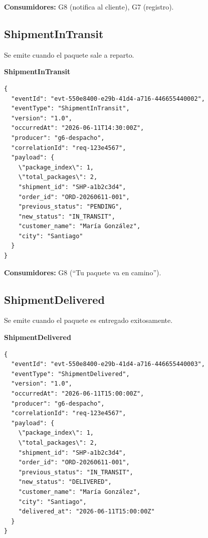\documentclass[11pt, a4paper]{article}
\newcommand{\contractheader}[1]{%
  \noindent\colorbox{primary!10}{%
    \parbox{\dimexpr\textwidth-2\fboxsep}{%
      \textbf{\faFileCode\quad #1}%
    }%
  }
  \vspace{0.3cm}
}
\begin{document}
\textbf{Consumidores:} G8 (notifica al cliente), G7 (registro).

\vspace{0.4cm}

\subsection{ShipmentInTransit}

Se emite cuando el paquete sale a reparto.

\contractheader{ShipmentInTransit}

\begin{lstlisting}
{
  "eventId": "evt-550e8400-e29b-41d4-a716-446655440002",
  "eventType": "ShipmentInTransit",
  "version": "1.0",
  "occurredAt": "2026-06-11T14:30:00Z",
  "producer": "g6-despacho",
  "correlationId": "req-123e4567",
  "payload": {
    \"package_index\": 1,
    \"total_packages\": 2,
    "shipment_id": "SHP-a1b2c3d4",
    "order_id": "ORD-20260611-001",
    "previous_status": "PENDING",
    "new_status": "IN_TRANSIT",
    "customer_name": "María González",
    "city": "Santiago"
  }
}
\end{lstlisting}

\textbf{Consumidores:} G8 (``Tu paquete va en camino'').

\vspace{0.4cm}

\subsection{ShipmentDelivered}

Se emite cuando el paquete es entregado exitosamente.

\contractheader{ShipmentDelivered}

\begin{lstlisting}
{
  "eventId": "evt-550e8400-e29b-41d4-a716-446655440003",
  "eventType": "ShipmentDelivered",
  "version": "1.0",
  "occurredAt": "2026-06-11T15:00:00Z",
  "producer": "g6-despacho",
  "correlationId": "req-123e4567",
  "payload": {
    \"package_index\": 1,
    \"total_packages\": 2,
    "shipment_id": "SHP-a1b2c3d4",
    "order_id": "ORD-20260611-001",
    "previous_status": "IN_TRANSIT",
    "new_status": "DELIVERED",
    "customer_name": "María González",
    "city": "Santiago",
    "delivered_at": "2026-06-11T15:00:00Z"
  }
}
\end{lstlisting}
\end{document}

